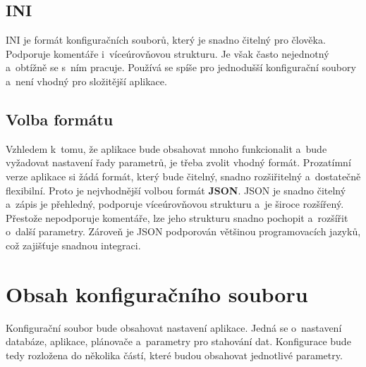 \subsection{INI}
INI je formát konfiguračních souborů, který je snadno čitelný pro člověka.
Podporuje komentáře i~víceúrovňovou strukturu.
Je však často nejednotný a~obtížně se s~ním pracuje.
Používá se spíše pro jednodušší konfigurační soubory a~není vhodný pro složitější aplikace.

\subsection{Volba formátu}
Vzhledem k~tomu, že aplikace bude obsahovat mnoho funkcionalit a~bude vyžadovat nastavení řady parametrů, je třeba zvolit vhodný formát.
Prozatímní verze aplikace si žádá formát, který bude čitelný, snadno rozšiřitelný a~dostatečně flexibilní.
Proto je nejvhodnější volbou formát \textbf{JSON}.
JSON je snadno čitelný a~zápis je přehledný, podporuje víceúrovňovou strukturu a~je široce rozšířený.
Přestože nepodporuje komentáře, lze jeho strukturu snadno pochopit a~rozšířit o~další parametry.
Zároveň je JSON podporován většinou programovacích jazyků, což zajišťuje snadnou integraci.

\section{Obsah konfiguračního souboru}
\label{sec:konfiguracni_soubor}
Konfigurační soubor bude obsahovat nastavení aplikace.
Jedná se o~nastavení databáze, aplikace, plánovače a~parametry pro stahování dat.
Konfigurace bude tedy rozložena do několika částí, které budou obsahovat jednotlivé parametry.

